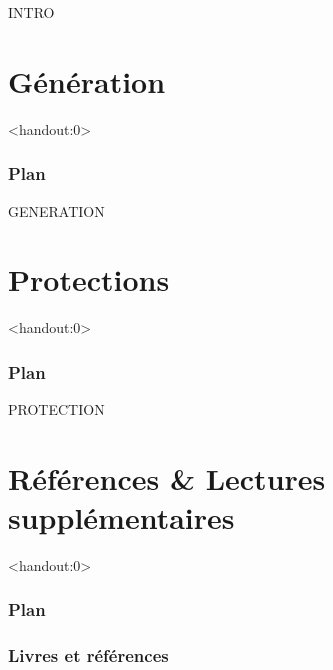 \begin{frame}[fragile]

INTRO

\end{frame}


\section{Génération}

\begin{frame}<handout:0>
  \frametitle{Plan}
  \tableofcontents[currentsection]
\end{frame}

\begin{frame}

GENERATION

\end{frame}

\section{Protections}

\begin{frame}<handout:0>
  \frametitle{Plan}
  \tableofcontents[currentsection]
\end{frame}

\begin{frame}

PROTECTION

\end{frame}

\section{Références \& Lectures supplémentaires}

\begin{frame}<handout:0>
  \frametitle{Plan}
  \tableofcontents[currentsection,subsectionstyle=hide]
\end{frame}

\nocite{*}


\begin{frame}[allowframebreaks]
  \frametitle{Livres et références}
  
\end{frame}

\begin{frame}
  \vfill
  \centering
  \vfill
\end{frame}
